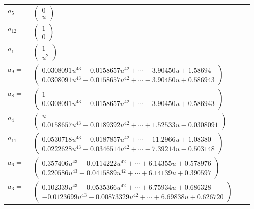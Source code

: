 \documentclass[1p]{elsarticle_modified}
\theoremstyle{definition}
\begin{document}
\begin{tabular}{m{7pt} m{180pt} m{7pt} m{180pt} }
\flushright $a_{5}=$&$\begin{pmatrix}0\\u\end{pmatrix}$ \\
\flushright $a_{12}=$&$\begin{pmatrix}1\\0\end{pmatrix}$ \\
\flushright $a_{1}=$&$\begin{pmatrix}1\\u^2\end{pmatrix}$ \\
\flushright $a_{9}=$&$\begin{pmatrix}0.0308091 u^{43}+0.0158657 u^{42}+\cdots-3.90450 u+1.58694\\0.0308091 u^{43}+0.0158657 u^{42}+\cdots-3.90450 u+0.586943\end{pmatrix}$ \\
\flushright $a_{8}=$&$\begin{pmatrix}1\\0.0308091 u^{43}+0.0158657 u^{42}+\cdots-3.90450 u+0.586943\end{pmatrix}$ \\
\flushright $a_{4}=$&$\begin{pmatrix}u\\0.0158657 u^{43}+0.0189392 u^{42}+\cdots+1.52533 u-0.0308091\end{pmatrix}$ \\
\flushright $a_{11}=$&$\begin{pmatrix}0.0530718 u^{43}-0.0187857 u^{42}+\cdots-11.2966 u+1.08380\\0.0222628 u^{43}-0.0346514 u^{42}+\cdots-7.39214 u-0.503148\end{pmatrix}$ \\
\flushright $a_{6}=$&$\begin{pmatrix}0.357406 u^{43}+0.0114222 u^{42}+\cdots+6.14355 u+0.578976\\0.220586 u^{43}+0.0415889 u^{42}+\cdots+6.14139 u+0.390597\end{pmatrix}$ \\
\flushright $a_{3}=$&$\begin{pmatrix}0.102339 u^{43}-0.0535366 u^{42}+\cdots+6.75934 u+0.686328\\-0.0123699 u^{43}-0.00873329 u^{42}+\cdots+6.69838 u+0.626720\end{pmatrix}$ \\

\end{tabular}
\end{document}
